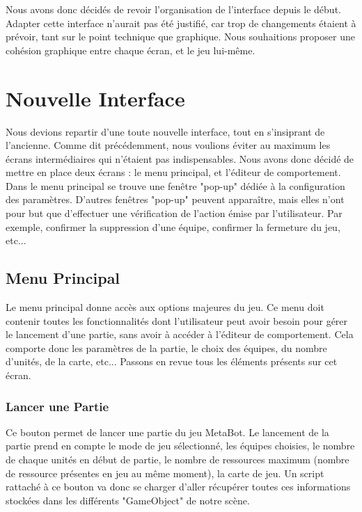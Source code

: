 \documentclass{report}
\begin{document}
Nous avons donc décidés de revoir l'organisation de l'interface depuis le début. Adapter cette interface n'aurait pas été justifié, car trop de changements étaient à prévoir, tant sur le point technique que graphique.\newline
Nous souhaitions proposer une cohésion graphique entre chaque écran, et le jeu lui-même.


\section{Nouvelle Interface}
Nous devions repartir d'une toute nouvelle interface, tout en s'insiprant de l'ancienne. Comme dit précédemment, nous voulions éviter au maximum les écrans intermédiaires qui n'étaient pas indispensables.
Nous avons donc décidé de mettre en place deux écrans : le menu principal,  et l'éditeur de comportement. Dans le menu principal se trouve une fenêtre "pop-up" dédiée à la configuration des paramètres. D'autres fenêtres "pop-up" peuvent apparaître, mais elles n'ont pour but que d'effectuer une vérification de l'action émise par l'utilisateur. Par exemple, confirmer la suppression d'une équipe, confirmer la fermeture du jeu, etc...

\subsection{Menu Principal}
Le menu principal donne accès aux options majeures du jeu. Ce menu doit contenir toutes les fonctionnalités dont l'utilisateur peut avoir besoin pour gérer le lancement d'une partie, sans avoir à accéder à l'éditeur de comportement.
Cela comporte donc les paramètres de la partie, le choix des équipes, du nombre d'unités, de la carte, etc... \newline
Passons en revue tous les éléments présents sur cet écran.
\subsubsection{Lancer une Partie}
Ce bouton permet de lancer une partie du jeu MetaBot. Le lancement de la partie prend en compte le mode de jeu sélectionné, les équipes choisies, le nombre de chaque unités en début de partie, le nombre de ressources maximum (nombre de ressource présentes en jeu au même moment), la carte de jeu. Un script rattaché à ce bouton va donc se charger d'aller récupérer toutes ces informations stockées dans les différents "GameObject" de notre scène.
\end{document}

